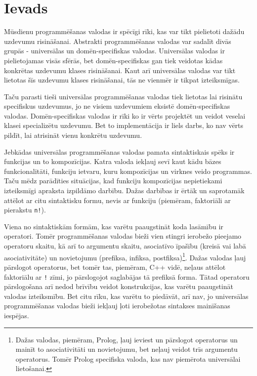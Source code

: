 \section{\label{s:introduction}Ievads}

Mūsdienu programmēšanas valodas ir spēcīgi rīki, kas var tikt pielietoti dažādu uzdevumu risināšanai. Abstrakti programmēšanas valodas var sadalīt divās grupās - universālas un domēn-specifiskas valodas. Universālas valodas ir pielietojamas visās sfērās, bet domēn-specifiskas gan tiek veidotas kādas konkrētas uzdevumu klases risināšanai. Kaut arī universālas valodas var tikt lietotas šīs uzdevumu klases risināšanai, tās ne vienmēr ir tikpat izteiksmīgas.

Taču parasti tieši universālas programmēšanas valodas tiek lietotas lai risinātu specifiskus uzdevumus, jo ne visiem uzdevumiem eksistē domēn-specifiskas valodas. Domēn-specifiskas valodas ir rīki ko ir vērts projektēt un veidot veselai klasei specializētu uzdevumu. Bet to implementācija ir liels darbs, ko nav vērts pildīt, lai atrisināt vienu konkrētu uzdevumu.

Jebkādas universālas programmēšanas valodas pamata sintaktiskais spēks ir funkcijas un to kompozīcijas. Katra valoda iekļauj sevī kaut kādu bāzes funkcionalitāti, funkciju ietvaru, kuru kompozīcijas un virknes veido programmas. Taču mēdz parādīties situācijas, kad funkciju kompozīcijas nepietiekami izteiksmīgi apraksta izpildāmo darbību. Dažas darbības ir ērtāk un saprotamāk attēlot ar citu sintaktisku formu, nevis ar funkciju (piemēram, faktoriāli ar pierakstu \verb|n!|).

Viena no sintaktiskām formām, kas varētu paaugstināt koda lasāmību ir operatori. Tomēr programmēšanas valodas bieži vien stingri ierobežo pieejamo operatoru skaitu, kā arī to argumentu skaitu, asociatīvo īpašību (kreisā vai labā asociativitāte) un novietojumu (prefiksa, infiksa, postfiksa)\footnote{Dažas valodas, piemēram, Prolog, ļauj ieviest un pārslogot operatorus un mainīt to asociativitāti un novietojumu, bet neļauj veidot trīs argumentu operatorus. Tomēr Prolog specifiska valoda, kas nav piemērota universālai lietošanai.}. Dažas valodas ļauj pārslogot operatorus, bet tomēr tas, piemēram, C++ vidē, neļaus attēlot faktoriālu ar \verb|!| zīmi, jo pārslogojot saglabājas tā prefiksā forma. Tātad operatoru pārslogošana arī nedod brīvību veidot konstrukcijas, kas varētu paaugstināt valodas izteiksmību. Bet citu rīku, kas varētu to piedāvāt, arī nav, jo universālas programmēšanas valodas bieži iekļauj ļoti ierobežotas sintakses mainīšanas iespējas.

